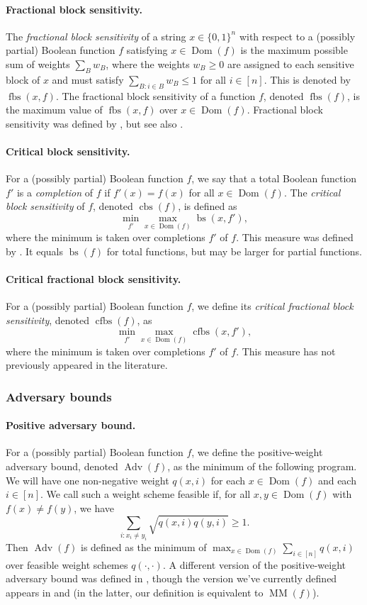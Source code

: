\documentclass[10pt,a4paper]{article}
\theoremstyle{definition}
\DeclareMathOperator{\Dom}{Dom}
\newcommand{\B}{\{0,1\}}
\renewcommand{\>}{\rangle}
\newcommand{\<}{\langle}
\DeclareMathOperator{\bs}{bs}
\DeclareMathOperator{\fbs}{fbs}
\DeclareMathOperator{\cbs}{cbs}
\DeclareMathOperator{\cfbs}{cfbs}
\DeclareMathOperator{\Adv}{Adv}
\begin{document}
\paragraph{Fractional block sensitivity.} The
\emph{fractional block sensitivity} of a string $x\in\B^n$
with respect to a (possibly partial) Boolean function $f$
satisfying $x\in\Dom(f)$ is the maximum possible
sum of weights $\sum_B w_B$, where the weights $w_B\ge 0$
are assigned to each sensitive block of $x$ and must satisfy
$\sum_{B:i\in B} w_B\le 1$ for all $i\in[n]$.
This is denoted by $\fbs(x,f)$. The fractional block sensitivity
of a function $f$, denoted $\fbs(f)$, is the maximum value of
$\fbs(x,f)$ over $x\in\Dom(f)$.
Fractional block sensitivity was defined by \cite{Aar08},
but see also \cite{KT16}.

\paragraph{Critical block sensitivity.}
For a (possibly partial) Boolean function $f$, we say that
a total Boolean function $f'$ is a \emph{completion} of $f$
if $f'(x)=f(x)$ for all $x\in\Dom(f)$. The \emph{critical block
sensitivity} of $f$, denoted $\cbs(f)$, is defined as
\[\min_{f'}\max_{x\in\Dom(f)}\bs(x,f'),\]
where the minimum is taken over completions $f'$ of $f$.
This measure was defined by \cite{HN12}. It equals $\bs(f)$
for total functions, but may be larger for partial functions.

\paragraph{Critical fractional block sensitivity.}
For a (possibly partial) Boolean function $f$, we define
its \emph{critical fractional block sensitivity}, denoted
$\cfbs(f)$, as
\[\min_{f'}\max_{x\in\Dom(f)}\cfbs(x,f'),\]
where the minimum is taken over completions $f'$ of $f$.
This measure has not previously appeared in the literature.

\subsubsection{Adversary bounds}
\label{sec:prelim_adv}

\paragraph{Positive adversary bound.}
For a (possibly partial) Boolean function $f$,
we define the positive-weight adversary bound,
denoted $\Adv(f)$, as the minimum of the following program.
We will have one non-negative weight $q(x,i)$
for each $x\in\Dom(f)$ and each $i\in[n]$. We call
such a weight scheme feasible if, for all
$x,y\in\Dom(f)$ with $f(x)\ne f(y)$,
we have
\[\sum_{i:x_i\ne y_i} \sqrt{q(x,i)q(y,i)}\ge 1.\]
Then $\Adv(f)$ is defined as the minimum
of $\max_{x\in\Dom(f)}\sum_{i\in[n]} q(x,i)$
over feasible weight schemes $q(\cdot,\cdot)$.
A different version of the positive-weight
adversary bound was defined in \cite{Amb02},
though the version we've currently defined
appears in \cite{LM08} and \cite{SS06}
(in the latter, our definition is equivalent
to $\operatorname{MM}(f)$).
\end{document}
